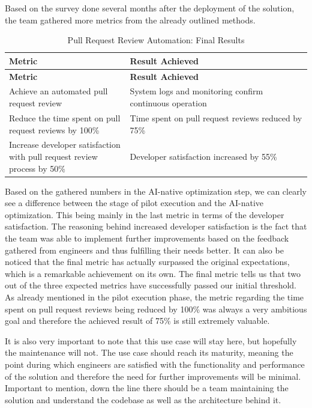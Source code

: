 \documentclass[]{imc-inf}
\begin{document}
Based on the survey done several months after the deployment of the solution, the team gathered more metrics from the already outlined methods.

\begin{longtable}{|p{0.4\linewidth}|p{0.6\linewidth}|}
	\hline
	\textbf{Metric} & \textbf{Result Achieved} \\
	\hline
	\endfirsthead
	
	\hline
	\textbf{Metric} & \textbf{Result Achieved} \\
	\hline
	\endhead
	
	\hline
	\caption{Pull Request Review Automation: Final Results}
	\label{tab:pr_review_final_results}
	\endlastfoot
	
	Achieve an automated pull request review &
	System logs and monitoring confirm continuous operation \\
	\hline
	
	Reduce the time spent on pull request reviews by 100\% &
	Time spent on pull request reviews reduced by 75\% \\
	\hline
	
	Increase developer satisfaction with pull request review process by 50\% &
	Developer satisfaction increased by 55\% \\
	\hline
\end{longtable}

Based on the gathered numbers in the AI-native optimization step, we can clearly see a difference between the stage of pilot execution and the AI-native optimization. This being mainly in the last metric in terms of the developer satisfaction. 
The reasoning behind increased developer satisfaction is the fact that the team was able to implement further improvements based on the feedback gathered from engineers and thus fulfilling their needs better. It can also be noticed that the final metric has actually surpassed the original expectations, which is a remarkable achievement on its own. 
The final metric tells us that two out of the three expected metrics have successfully passed our initial threshold.
As already mentioned in the pilot execution phase, the metric regarding the time spent on pull request reviews being reduced by 100\% was always a very ambitious goal and therefore the achieved result of 75\% is still extremely valuable.


It is also very important to note that this use case will stay here, but hopefully the maintenance will not. The use case should reach its maturity, meaning the point during which engineers are satisfied with the functionality and performance of the solution and therefore the need for further improvements will be minimal. Important to mention, down the line there should be a team maintaining the solution and understand the codebase as well as the architecture behind it. 
\end{document}
